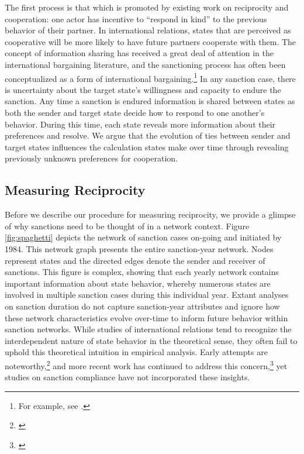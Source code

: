 The first process is that which is promoted by existing work on reciprocity and cooperation: one actor has incentive to ``respond in kind'' to the previous behavior of their partner. In international relations, states that are perceived as cooperative will be more likely to have future partners cooperate with them. The concept of information sharing has received a great deal of attention in the international bargaining literature, and the sanctioning process has often been conceptualized as a form of international bargaining.\footnote{For example, see \cite{morgan1999threats,lacy2004theory,marinov2005}.} In any sanction case, there is uncertainty about the target state's willingness and capacity to endure the sanction.  Any time a sanction is endured information is shared between states as both the sender and target state decide how to respond to one another's behavior. During this time, each state reveals more information about their preferences and resolve. We argue that the evolution of ties between sender and target states influences the calculation states make over time through revealing previously unknown preferences for cooperation. 


\subsection{Measuring Reciprocity}

Before we describe our procedure for measuring reciprocity, we provide a glimpse of why sanctions need to be thought of in a network context. Figure \ref{fig:spaghetti} depicts the network of sanction cases on-going and initiated by 1984. This network graph presents the entire sanction-year network.  Nodes represent states and the directed edges denote the sender and receiver of sanctions. This figure is complex, showing that each yearly network contains important information about state behavior, whereby numerous states are involved in multiple sanction cases during this individual year. Extant analyses on sanction duration do not capture sanction-year attributes and ignore how these network characteristics evolve over-time to inform future behavior within sanction networks. While studies of international relations tend to recognize the interdependent nature of state behavior in the theoretical sense, they often fail to uphold this theoretical intuition in empirical analysis. Early attempts are noteworthy,\footnote{\cite{keohane1989reciprocity,goldstein1991reciprocity}} and more recent work has continued to address this concern,\footnote{\cite{mitchell2001,cranmer2014reciprocity}} yet studies on sanction compliance have not incorporated these insights. 

